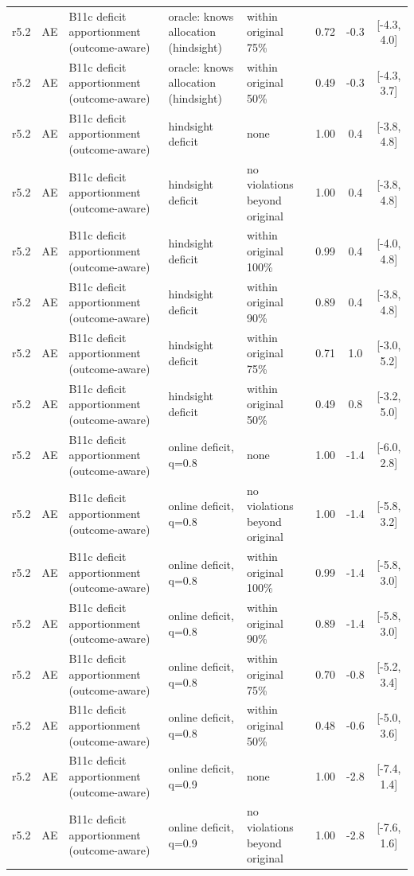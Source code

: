 \begin{longtable}{lllp{4.2cm}p{3.4cm}ccc}
r5.2 & AE & B11c deficit apportionment (outcome-aware) & oracle: knows allocation (hindsight) & within original 75\% & 0.72 & -0.3 & [-4.3, 4.0] \\
r5.2 & AE & B11c deficit apportionment (outcome-aware) & oracle: knows allocation (hindsight) & within original 50\% & 0.49 & -0.3 & [-4.3, 3.7] \\
r5.2 & AE & B11c deficit apportionment (outcome-aware) & hindsight deficit & none & 1.00 & 0.4 & [-3.8, 4.8] \\
r5.2 & AE & B11c deficit apportionment (outcome-aware) & hindsight deficit & no violations beyond original & 1.00 & 0.4 & [-3.8, 4.8] \\
r5.2 & AE & B11c deficit apportionment (outcome-aware) & hindsight deficit & within original 100\% & 0.99 & 0.4 & [-4.0, 4.8] \\
r5.2 & AE & B11c deficit apportionment (outcome-aware) & hindsight deficit & within original 90\% & 0.89 & 0.4 & [-3.8, 4.8] \\
r5.2 & AE & B11c deficit apportionment (outcome-aware) & hindsight deficit & within original 75\% & 0.71 & 1.0 & [-3.0, 5.2] \\
r5.2 & AE & B11c deficit apportionment (outcome-aware) & hindsight deficit & within original 50\% & 0.49 & 0.8 & [-3.2, 5.0] \\
r5.2 & AE & B11c deficit apportionment (outcome-aware) & online deficit, q=0.8 & none & 1.00 & -1.4 & [-6.0, 2.8] \\
r5.2 & AE & B11c deficit apportionment (outcome-aware) & online deficit, q=0.8 & no violations beyond original & 1.00 & -1.4 & [-5.8, 3.2] \\
r5.2 & AE & B11c deficit apportionment (outcome-aware) & online deficit, q=0.8 & within original 100\% & 0.99 & -1.4 & [-5.8, 3.0] \\
r5.2 & AE & B11c deficit apportionment (outcome-aware) & online deficit, q=0.8 & within original 90\% & 0.89 & -1.4 & [-5.8, 3.0] \\
r5.2 & AE & B11c deficit apportionment (outcome-aware) & online deficit, q=0.8 & within original 75\% & 0.70 & -0.8 & [-5.2, 3.4] \\
r5.2 & AE & B11c deficit apportionment (outcome-aware) & online deficit, q=0.8 & within original 50\% & 0.48 & -0.6 & [-5.0, 3.6] \\
r5.2 & AE & B11c deficit apportionment (outcome-aware) & online deficit, q=0.9 & none & 1.00 & -2.8 & [-7.4, 1.4] \\
r5.2 & AE & B11c deficit apportionment (outcome-aware) & online deficit, q=0.9 & no violations beyond original & 1.00 & -2.8 & [-7.6, 1.6] \\

\end{longtable}

